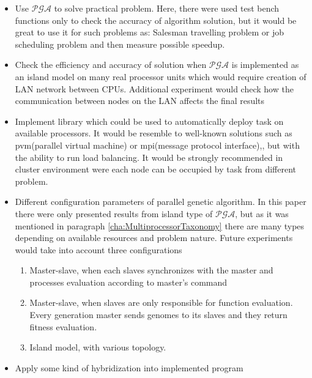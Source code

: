 \begin{itemize}
	\item Use $\mathcal{PGA}$ to solve practical problem. Here, there were used
		test bench functions only to check the accuracy of algorithm solution, but it
		would be great to use it for such problems as: Salesman travelling problem or job scheduling
		problem and then measure possible speedup.
	\item Check the efficiency and accuracy of solution when $\mathcal{PGA}$ is
		implemented as an island model on many real processor units which would require
		creation of LAN network between CPUs. Additional experiment would check
		how the communication between nodes on the LAN affects the final results
	\item Implement library which could be used to automatically deploy task on
		available processors. It would be resemble to well-known solutions such
		as pvm(parallel virtual machine) or mpi(message protocol
		interface)\cite{bib13},\cite{bib23}, but with the ability to run
		load balancing. It would be strongly recommended in cluster
		environment were each node can be occupied by task from different
		problem. 
	\item Different configuration parameters of parallel genetic algorithm. In this
		paper there were only presented results from island type of
		$\mathcal{PGA}$, but as it was mentioned in paragraph \ref{cha:MultiprocessorTaxonomy}
		there are many types depending on available resources and problem
		nature. Future experiments would take into account three configurations
		\begin{enumerate}
			\item Master-slave, when each slaves synchronizes with the master and
				processes evaluation according to master's command
			\item Master-slave, when slaves are only responsible for function
				evaluation. Every generation master sends genomes to its slaves
				and they return fitness evaluation. 
			\item Island model, with various topology.
		\end{enumerate}
	\item Apply some kind of hybridization into implemented program
\end{itemize}

